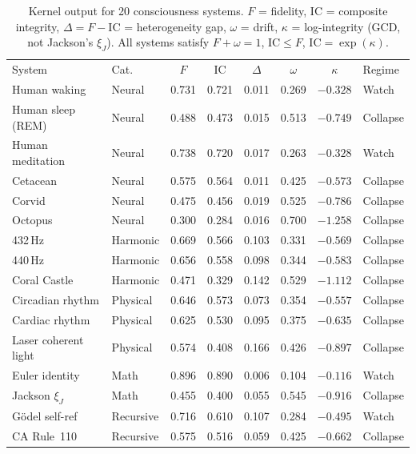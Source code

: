 \documentclass[
  aps,
  prd,
  twocolumn,
  superscriptaddress,
  nofootinbib,
  floatfix
]{revtex4-2}
\newcommand{\IC}{\mathrm{IC}}
\newcommand{\xiJ}{\xi_J}
\begin{document}
\begin{table}[t]
\caption{Kernel output for 20 consciousness systems.  $F$ = fidelity,
$\IC$ = composite integrity, $\Delta = F - \IC$ = heterogeneity gap,
$\omega$ = drift, $\kappa$ = log-integrity (GCD, not Jackson's $\xiJ$).
All systems satisfy $F + \omega = 1$, $\IC \leq F$, $\IC = \exp(\kappa)$.}
\label{tab:kernel}
\begin{ruledtabular}
\begin{tabular}{llcccccl}
\textrm{System} & \textrm{Cat.} & $F$ & $\IC$ & $\Delta$ & $\omega$ & $\kappa$ & \textrm{Regime} \\
\colrule
Human waking         & Neural   & 0.731 & 0.721 & 0.011 & 0.269 & $-0.328$ & Watch    \\
Human sleep (REM)    & Neural   & 0.488 & 0.473 & 0.015 & 0.513 & $-0.749$ & Collapse \\
Human meditation     & Neural   & 0.738 & 0.720 & 0.017 & 0.263 & $-0.328$ & Watch    \\
Cetacean             & Neural   & 0.575 & 0.564 & 0.011 & 0.425 & $-0.573$ & Collapse \\
Corvid               & Neural   & 0.475 & 0.456 & 0.019 & 0.525 & $-0.786$ & Collapse \\
Octopus              & Neural   & 0.300 & 0.284 & 0.016 & 0.700 & $-1.258$ & Collapse \\
432\,Hz              & Harmonic & 0.669 & 0.566 & 0.103 & 0.331 & $-0.569$ & Collapse \\
440\,Hz              & Harmonic & 0.656 & 0.558 & 0.098 & 0.344 & $-0.583$ & Collapse \\
Coral Castle         & Harmonic & 0.471 & 0.329 & 0.142 & 0.529 & $-1.112$ & Collapse \\
Circadian rhythm     & Physical & 0.646 & 0.573 & 0.073 & 0.354 & $-0.557$ & Collapse \\
Cardiac rhythm       & Physical & 0.625 & 0.530 & 0.095 & 0.375 & $-0.635$ & Collapse \\
Laser coherent light & Physical & 0.574 & 0.408 & 0.166 & 0.426 & $-0.897$ & Collapse \\
Euler identity       & Math     & 0.896 & 0.890 & 0.006 & 0.104 & $-0.116$ & Watch    \\
Jackson $\xiJ$       & Math     & 0.455 & 0.400 & 0.055 & 0.545 & $-0.916$ & Collapse \\
G\"odel self-ref      & Recursive & 0.716 & 0.610 & 0.107 & 0.284 & $-0.495$ & Watch    \\
CA Rule~110          & Recursive & 0.575 & 0.516 & 0.059 & 0.425 & $-0.662$ & Collapse \\

\end{tabular}
\end{ruledtabular}
\end{table}
\end{document}
